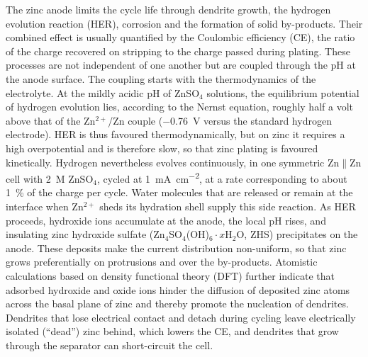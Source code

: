 The zinc anode limits the cycle life through dendrite growth, the hydrogen evolution reaction (HER), corrosion and the formation of solid by-products\cite{dong_towards_2022}.
Their combined effect is usually quantified by the Coulombic efficiency (CE), the ratio of the charge recovered on stripping to the charge passed during plating\cite{dong_towards_2022}.
These processes are not independent of one another but are coupled through the pH at the anode surface.
The coupling starts with the thermodynamics of the electrolyte.
At the mildly acidic pH of ZnSO$_4$ solutions\cite{cui_revealing_2025,price_ion_1991}, the equilibrium potential of hydrogen evolution lies, according to the Nernst equation, roughly half a volt above that of the Zn$^{2+}$/Zn couple (\SI{-0.76}{V} versus the standard hydrogen electrode\cite{dong_towards_2022}).
HER is thus favoured thermodynamically, but on zinc it requires a high overpotential and is therefore slow, so that zinc plating is favoured kinetically\cite{cui_revealing_2025,rana_electroanalytical_2025}.
Hydrogen nevertheless evolves continuously, in one symmetric Zn$\|$Zn cell with \SI{2}{M} ZnSO$_4$, cycled at \SI{1}{mA.cm^{-2}}, at a rate corresponding to about \SI{1}{\percent} of the charge per cycle\cite{kao_suppressing_2023}.
Water molecules that are released or remain at the interface when Zn$^{2+}$ sheds its hydration shell supply this side reaction\cite{xu_electrolyte_2023,yu_unlocking_2024}.
As HER proceeds, hydroxide ions accumulate at the anode, the local pH rises, and insulating zinc hydroxide sulfate (Zn$_4$SO$_4$(OH)$_6\cdot x$H$_2$O, ZHS) precipitates on the anode\cite{dong_towards_2022,cui_revealing_2025}.
These deposits make the current distribution non-uniform, so that zinc grows preferentially on protrusions and over the by-products\cite{cui_revealing_2025}.
Atomistic calculations based on density functional theory (DFT) further indicate that adsorbed hydroxide and oxide ions hinder the diffusion of deposited zinc atoms across the basal plane of zinc and thereby promote the nucleation of dendrites\cite{zhang_unveiling_2024}.
Dendrites that lose electrical contact and detach during cycling leave electrically isolated (``dead'') zinc behind, which lowers the CE\cite{gu_role_2025,xu_electrolyte_2023}, and dendrites that grow through the separator can short-circuit the cell\cite{dong_towards_2022,hansen_role_2023}.

